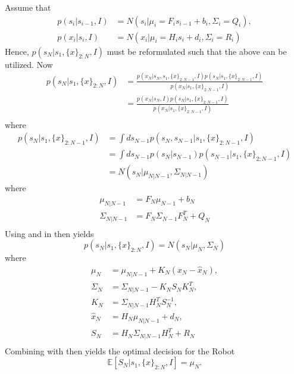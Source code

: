 \begin{example}
\begin{equation}
	\end{equation}
	Assume that
	\begin{equation}
		\begin{split}
			p(s_i|s_{i-1},I) &= N(s_i|\mu_i = F_is_{i-1}+b_i,\Sigma_i = Q_i),\\
			p(x_i|s_{i},I) &= N(x_i|\mu_i = H_is_{i}+d_i,\Sigma_i = R_i)
		\end{split}
		\label{eq:a2}
	\end{equation}
	Hence, $p(s_N|s_1,\{x\}_{2:N},I)$ must be reformulated such that the above can be utilized. 
	Now
	\begin{equation}
		\begin{split}
			p(s_N|s_1,\{x\}_{2:N},I) &= \frac{p(x_{N}|s_N,s_1,\{x\}_{2:N-1},I)p(s_N|s_1,\{x\}_{2:N-1},I)}{p(x_{N}|s_1,\{x\}_{2:N-1},I)}\\
			&= \frac{p(x_{N}|s_N,I)p(s_N|s_1,\{x\}_{2:N-1},I)}{p(x_{N}|s_1,\{x\}_{2:N-1},I)}\\
		\end{split}
		\label{eq:a3}
	\end{equation}
	where
	\begin{equation}
		\begin{split}
			p(s_N|s_1,\{x\}_{2:N-1},I) &= \int ds_{N-1}p(s_N,s_{N-1}|s_1,\{x\}_{2:N-1},I)\\
			&= \int ds_{N-1}p(s_N|s_{N-1})p(s_{N-1}|s_1,\{x\}_{2:N-1},I)\\
			&=N(s_{N}|\mu_{N|N-1},\Sigma_{N|N-1})
		\end{split}
		\label{eq:a1}
	\end{equation}
	where 
	\begin{equation}
		\begin{split}
			\mu_{N|N-1} &= F_{N}\mu_{N-1}+b_N\\
			\Sigma_{N|N-1} &= F_{N}\Sigma_{N-1}F_{N}^T+Q_{N}\\
		\end{split}
	\end{equation}
	Using  and  in  then yields~\citep{murphy2023probabilistic}
	\begin{equation}
		p(s_N|s_1,\{x\}_{2:N},I) = N(s_N|\mu_{N},\Sigma_N)
		\label{eq:a4}
	\end{equation}
	where
	\begin{equation}
		\begin{split}
			\mu_{N} &= \mu_{N|N-1}+K_N(x_N-\hat{x}_N),\\
			\Sigma_{N} &= \Sigma_{N|N-1}-K_NS_NK_N^T,\\
			K_N & = \Sigma_{N|N-1}H_N^TS_N^{-1},\\
			\hat{x}_N&= H_N\mu_{N|N-1}+d_N,\\
			S_N & = H_N\Sigma_{N|N-1}H_N^T+R_N\\
		\end{split}
	\end{equation}
	Combining  with  then yields the optimal decision for the Robot
	\begin{equation}
		\mathbb{E}[S_{N}|s_1,\{x\}_{2:N},I] = \mu_{N}.
	\end{equation}
	
\end{example}


